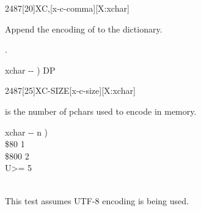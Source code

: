 \begin{worddef}{2487}[20]{XC,}[x-c-comma][X:xchar]
\item {}

	Append the encoding of  to the dictionary.

\see {}.

	\begin{implement}
	\word{:}   xchar -{}- )   DP \word{!} \word{;}
	\end{implement}
\end{worddef}


\begin{worddef}{2487}[25]{XC-SIZE}[x-c-size][X:xchar]
\item {}

	 is the number of pchars used to encode  in memory.

	\begin{implement}
	\word{:}   xchar -{}- n ) \\
	\tab {} \$80    1     \\
	\tab \$800  2  \\
	\tab {}  U>=   5         \\
	\tab {}  \\
	\word{;}
	\end{implement}

	\begin{testing}
		This test assumes UTF-8 encoding is being used.

		\ttfamily
		 \\
		 \\
		 \\
		 \\
		 \\
		 \\
		 \\
		 \\
  \end{testing}
\end{worddef}


